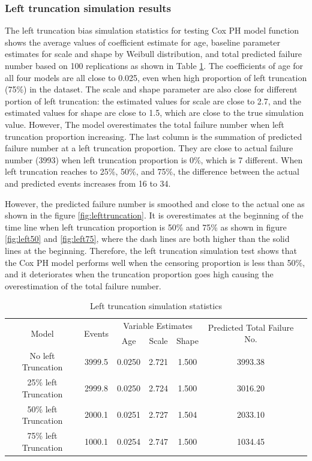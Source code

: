 \documentclass[12pt,letterpaper]{article}
\begin{document}
\subsubsection{Left truncation simulation results}
The left truncation bias simulation statistics for testing Cox PH model function shows the average values of coefficient estimate for age, baseline parameter estimates for scale and shape by Weibull distribution, and total predicted failure number based on 100 replications as shown in Table \ref{tab:lefttruncation}. The coefficients of age for all four models are all close to 0.025, even when high proportion of left truncation (75\%) in the dataset. The scale and shape parameter are also close for different portion of left truncation: the estimated values for scale are close to 2.7, and the estimated values for shape are close to 1.5, which are close to the true simulation value. However, The model overestimates the total failure number when left truncation proportion increasing. The last column is the summation of predicted failure number at a left truncation proportion. They are close to actual failure number (3993) when left truncation proportion is 0\%, which is 7 different. When left truncation reaches to 25\%, 50\%, and 75\%, the difference between the actual and predicted events increases from 16 to 34. 

However, the predicted failure number is smoothed and close to the actual one as shown in the figure \ref{fig:lefttruncation}. It is overestimates at the beginning of the time line when left truncation proportion is 50\% and 75\% as shown in figure \ref{fig:left50} and \ref{fig:left75}, where the dash lines are both higher than the solid lines at the beginning.
Therefore, the left truncation simulation test shows that the Cox PH model performs well when the censoring proportion is less than 50\%, and it deteriorates when the truncation proportion goes high causing the overestimation of the total failure number.
\begin{table}[h!]
	\renewcommand{\arraystretch}{1.5}
	\small
	\centering
	\caption{Left truncation simulation statistics}
	\begin{tabular}{ccccccc}
		\hline
		\multirow{2}[4]{*}{Model} & \multirow{2}[4]{*}{Events} & \multicolumn{3}{c}{Variable Estimates} & \multirow{2}{3cm}{Predicted Total Failure No.}  \\
		\cline{3-5} %
		&       & Age   & Scale & Shape &  &\\				
		\hline
		No left Truncation & 3999.5  & 0.0250 & 2.721 & 1.500  & 3993.38 \\
		25\%  left Truncation & 2999.8  & 0.0250 & 2.724  & 1.500  & 3016.20 \\
		50\%  left Truncation & 2000.1  & 0.0251 & 2.727 & 1.504  & 2033.10 \\
		75\%  left Truncation & 1000.1  & 0.0254 & 2.747 & 1.500  & 1034.45 \\
		\hline
	\end{tabular}%
	\label{tab:lefttruncation}%
\end{table}%
\end{document}
